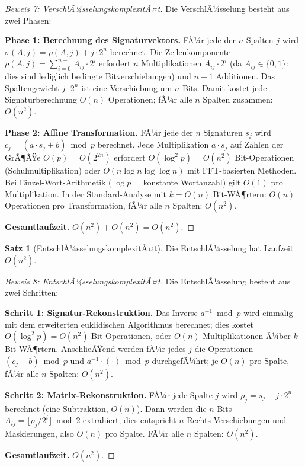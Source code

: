 ﻿\documentclass[a4paper,12pt]{scrreprt}
\theoremstyle{definition}
\newtheorem{satz}{Satz}[section]
\begin{document}
\begin{proof}[Beweis 7: VerschlÃ¼sselungskomplexitÃ¤t]
	Die VerschlÃ¼sselung besteht aus zwei Phasen:
	
	\textbf{Phase 1: Berechnung des Signaturvektors.}
	FÃ¼r jede der $n$ Spalten $j$ wird $\sigma(A,j) = \rho(A,j) + j \cdot 2^n$ berechnet. Die Zeilenkomponente $\rho(A,j) = \sum_{i=0}^{n-1} A_{ij} \cdot 2^i$ erfordert $n$ Multiplikationen $A_{ij} \cdot 2^i$ (da $A_{ij} \in \{0,1\}$: dies sind lediglich bedingte Bitverschiebungen) und $n-1$ Additionen. Das Spaltengewicht $j \cdot 2^n$ ist eine Verschiebung um $n$ Bits. Damit kostet jede Signaturberechnung $O(n)$ Operationen; fÃ¼r alle $n$ Spalten zusammen: $O(n^2)$.
	
	\textbf{Phase 2: Affine Transformation.}
	FÃ¼r jede der $n$ Signaturen $s_j$ wird $c_j = (a \cdot s_j + b) \bmod p$ berechnet. Jede Multiplikation $a \cdot s_j$ auf Zahlen der GrÃ¶ÃŸe $O(p) = O(2^{2n})$ erfordert $O(\log^2 p) = O(n^2)$ Bit-Operationen (Schulmultiplikation) oder $O(n \log n \log\log n)$ mit FFT-basierten Methoden. Bei Einzel-Wort-Arithmetik ($\log p$ = konstante Wortanzahl) gilt $O(1)$ pro Multiplikation. In der Standard-Analyse mit $k = O(n)$ Bit-WÃ¶rtern: $O(n)$ Operationen pro Transformation, fÃ¼r alle $n$ Spalten: $O(n^2)$.
	
	\textbf{Gesamtlaufzeit.} $O(n^2) + O(n^2) = O(n^2)$.
\end{proof}

\begin{satz}[EntschlÃ¼sselungskomplexitÃ¤t]
	\label{satz:dec-kompl}
	Die EntschlÃ¼sselung hat Laufzeit $O(n^2)$.
\end{satz}

\begin{proof}[Beweis 8: EntschlÃ¼sselungskomplexitÃ¤t]
	Die EntschlÃ¼sselung besteht aus zwei Schritten:
	
	\textbf{Schritt 1: Signatur-Rekonstruktion.}
	Das Inverse $a^{-1} \bmod p$ wird einmalig mit dem erweiterten euklidischen Algorithmus berechnet; dies kostet $O(\log^2 p) = O(n^2)$ Bit-Operationen, oder $O(n)$ Multiplikationen Ã¼ber $k$-Bit-WÃ¶rtern. AnschlieÃŸend werden fÃ¼r jedes $j$ die Operationen $(c_j - b) \bmod p$ und $a^{-1} \cdot (\cdot) \bmod p$ durchgefÃ¼hrt; je $O(n)$ pro Spalte, fÃ¼r alle $n$ Spalten: $O(n^2)$.
	
	\textbf{Schritt 2: Matrix-Rekonstruktion.}
	FÃ¼r jede Spalte $j$ wird $\rho_j = s_j - j \cdot 2^n$ berechnet (eine Subtraktion, $O(n)$). Dann werden die $n$ Bits $A_{ij} = \lfloor \rho_j / 2^i \rfloor \bmod 2$ extrahiert; dies entspricht $n$ Rechts-Verschiebungen und Maskierungen, also $O(n)$ pro Spalte. FÃ¼r alle $n$ Spalten: $O(n^2)$.
	
	\textbf{Gesamtlaufzeit.} $O(n^2)$.
\end{proof}
\end{document}
